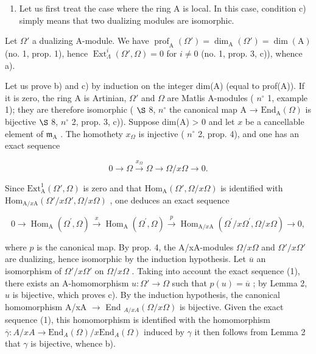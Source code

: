 \begin{enumerate}
\def\labelenumi{\Alph{enumi})}
\tightlist
\item
  Let us first treat the case where the ring A is local. In this case, condition c) simply means that two dualizing modules are isomorphic.
\end{enumerate}

Let \(\Omega'\) a dualizing A-module. We have \(\operatorname{prof}_{\mathrm{A}}(\Omega') = \dim_{\mathrm{A}}(\Omega') = \dim(\mathrm{A})\) (no. 1, prop. 1), hence \(\operatorname{Ext}_{\Lambda}^{i}(\Omega', \Omega) = 0\) for \(i \neq 0\) (no. 1, prop. 3, c)), whence a).

Let us prove b) and c) by induction on the integer dim(A) (equal to prof(A)). If it is zero, the ring A is Artinian, \(\Omega'\) and \(\Omega\) are Matlis A-modules ( \(n^{\circ}\) 1, example 1); they are therefore isomorphic ( \(\S\) 8, \(n^{\circ}\) the canonical map A → \(\mathrm{End}_{\mathrm{A}}(\Omega)\) is bijective \(\S\) 8, \(n^{\circ}\) 2, prop. 3, c)). Suppose dim(A) \textgreater{} 0 and let \(x\) be a cancellable element of \(\mathfrak{m}_{\mathrm{A}}\) . The homothety \(x_{\Omega}\) is injective ( \(n^{\circ}\) 2, prop. 4), and one has an exact sequence

\[
0 \rightarrow \Omega \xrightarrow {x _ {\Omega}} \Omega \longrightarrow \Omega / x \Omega \rightarrow 0.
\]

Since \(\mathrm{Ext}_{\mathrm{A}}^{1}(\Omega',\Omega)\) is zero and that \(\mathrm{Hom}_{\mathrm{A}}(\Omega',\Omega /x\Omega)\) is identified with \(\mathrm{Hom}_{\mathrm{A} / x\mathrm{A}}(\Omega'/x\Omega',\Omega/x\Omega)\) , one deduces an exact sequence

\[
0 \rightarrow \operatorname{Hom} _ {\mathrm{A}} \left(\Omega^ {\prime}, \Omega\right) \xrightarrow {x} \operatorname{Hom} _ {\mathrm{A}} \left(\Omega^ {\prime}, \Omega\right) \xrightarrow {p} \operatorname{Hom} _ {\mathrm{A} / x \mathrm{A}} \left(\Omega^ {\prime} / x \Omega^ {\prime}, \Omega / x \Omega\right)\rightarrow 0,\tag{1}
\]

where \(p\) is the canonical map. By prop. 4, the A/xA-modules \(\Omega/x\Omega\) and \(\Omega'/x\Omega'\) are dualizing, hence isomorphic by the induction hypothesis. Let \(\overline{u}\) an isomorphism of \(\Omega'/x\Omega'\) on \(\Omega/x\Omega\) . Taking into account the exact sequence (1), there exists an A-homomorphism \(u: \Omega' \to \Omega\) such that \(p(u) = \overline{u}\) ; by Lemma 2, \(u\) is bijective, which proves c). By the induction hypothesis, the canonical homomorphism A/xA \(\longrightarrow\) End \(_{A/xA}(\Omega/x\Omega)\) is bijective. Given the exact sequence (1), this homomorphism is identified with the homomorphism \(\overline{\gamma}: A/xA \longrightarrow \text{End}_A(\Omega)/x \text{End}_A(\Omega)\) induced by \(\gamma\) it then follows from Lemma 2 that \(\gamma\) is bijective, whence b).

